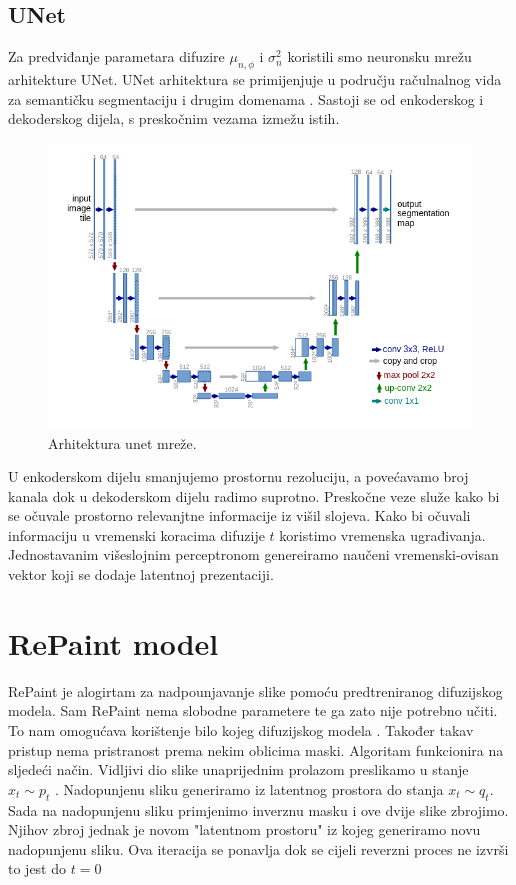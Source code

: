 \documentclass[10pt, a4paper, croatian]{article}
\begin{document}
\subsection{UNet}
Za predviđanje parametara difuzire $\mu_{n,\phi}$ i $\sigma^2_n$ koristili smo neuronsku mrežu arhitekture UNet.
UNet arhitektura se primijenjuje u području račulnalnog vida za semantičku segmentaciju i drugim domenama \cite{unet}.
Sastoji se od enkoderskog i dekoderskog dijela, s preskočnim vezama izmežu istih.
\begin{figure}
	\begin{center}
	\includegraphics[width=\columnwidth]{images/unet.png}
	\caption{Arhitektura unet mreže. \cite{unet}}
	\label{fig:figure1}
	\end{center}
\end{figure}
U enkoderskom dijelu smanjujemo prostornu rezoluciju, a povećavamo broj kanala dok u dekoderskom dijelu radimo suprotno. 
Preskočne veze služe kako bi se očuvale prostorno relevanjtne informacije iz višil slojeva.
Kako bi očuvali informaciju u vremenski koracima difuzije $t$ koristimo vremenska ugrađivanja.
Jednostavanim višeslojnim perceptronom genereiramo naučeni vremenski-ovisan vektor koji se dodaje latentnoj prezentaciji.

\section{RePaint model}
RePaint je alogirtam za nadpounjavanje slike pomoću predtreniranog difuzijskog modela. Sam RePaint nema slobodne parametere te ga zato nije
potrebno učiti. To nam omogućava korištenje bilo kojeg difuzijskog modela \cite{repaint}. Također takav pristup nema pristranost prema nekim oblicima maski. 
Algoritam funkcionira na sljedeći način. Vidljivi dio slike unaprijednim prolazom preslikamo u stanje $x_t \sim p_t$ . Nadopunjenu sliku 
generiramo iz latentnog prostora do stanja $x_t \sim q_t$. Sada na nadopunjenu sliku primjenimo inverznu masku i ove dvije slike zbrojimo. 
Njihov zbroj jednak je novom "latentnom prostoru" iz kojeg generiramo novu nadopunjenu sliku. Ova iteracija se ponavlja dok se cijeli reverzni
proces ne izvrši to jest do $t = 0$
\end{document}
